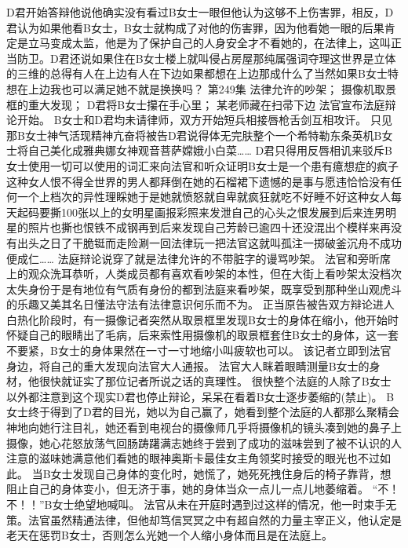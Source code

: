 \documentclass[a4paper,12pt,UTF8,twoside]{ctexbook}
\begin{document}
        D君开始答辩他说他确实没有看过B女士一眼但他认为这够不上伤害罪，相反，D君认为如果他看B女士，B女士就构成了对他的伤害罪，因为他看她一眼的后果肯定是立马变成太监，他是为了保护自己的人身安全才不看她的，在法律上，这叫正当防卫。D君还说如果住在B女士楼上就叫侵占房屋那纯属强词夺理这世界是立体的三维的总得有人在上边有人在下边如果都想在上边那成什么了当然如果B女士特想在上边我也可以满足她不就是换换吗？          第249集  
        法律允许的吵架；  
        摄像机取景框的重大发现；  
        D君将B女士攥在手心里；  
        某老师藏在扫帚下边    
       法官宣布法庭辩论开始。  
        B女士和D君均未请律师，双方开始短兵相接唇枪舌剑互相攻讦。  
        只见那B女士神气活现精神亢奋将被告D君说得体无完肤整个一个希特勒东条英机B女士将自己美化成雅典娜女神观音菩萨嫦娥小白菜…… 
        D君只得用反唇相讥来驳斥B女士使用一切可以使用的词汇来向法官和听众证明B女士是一个患有癔想症的疯子这种女人恨不得全世界的男人都拜倒在她的石榴裙下遗憾的是事与愿违恰恰没有任何一个上档次的异性理睬她于是她就愤怒就自卑就疯狂就吃不好睡不好这种女人每天起码要撕100张以上的女明星画报彩照来发泄自己的心头之恨发展到后来连男明星的照片也撕也恨铁不成钢再到后来发现自己芳龄已逾四十还没混出个模样来再没有出头之日了干脆铤而走险涮一回法律玩一把法官这就叫孤注一掷破釜沉舟不成功便成仁……  
        法庭辩论说穿了就是法律允许的不带脏字的谩骂吵架。  
        法官和旁昕席上的观众洗耳恭听，人类成员都有喜欢看吵架的本性，但在大街上看吵架太没档次太失身份于是有地位有气质有身份的都到法庭来看吵架，既享受到那种坐山观虎斗的乐趣又美其名日懂法守法有法律意识何乐而不为。  
        正当原告被告双方辩论进人白热化阶段时，有一摄像记者突然从取景框里发现B女士的身体在缩小，他开始时怀疑自己的眼睛出了毛病，后来索性用摄像机的取景框套住B女士的身体，这一套不要紧，B女士的身体果然在一寸一寸地缩小叫疲软也可以。  
        该记者立即到法官身边，将自己的重大发现向法官大人通报。  
        法官大人眯着眼睛测量B女士的身材，他很快就证实了那位记者所说之话的真理性。  
        很快整个法庭的人除了B女士以外都注意到这个现实D君也停止辩论，呆呆在看着B女士逐步萎缩的(禁止)。 
        B女士终于得到了D君的目光，她以为自己赢了，她看到整个法庭的人都那么聚精会神地向她行注目礼，她还看到电视台的摄像师几乎将摄像机的镜头凑到她的鼻子上摄像，她心花怒放荡气回肠踌躇满志她终于尝到了成功的滋味尝到了被不认识的人注意的滋味她满意他们看她的眼神奥斯卡最佳女主角领奖时接受的眼光也不过如此。  
        当B女士发现自己身体的变化时，她慌了，她死死拽住身后的椅子靠背，想阻止自己的身体变小，但无济于事，她的身体当众一点儿一点儿地萎缩着。  
        “不！不！！”B女士绝望地喊叫。  
        法官从未在开庭时遇到过这样的情况，他一时束手无策。法官虽然精通法律，但他却笃信冥冥之中有超自然的力量主宰正义，他认定是老天在惩罚B女士，否则怎么光她一个人缩小身体而且是在法庭上。  
\end{document}
